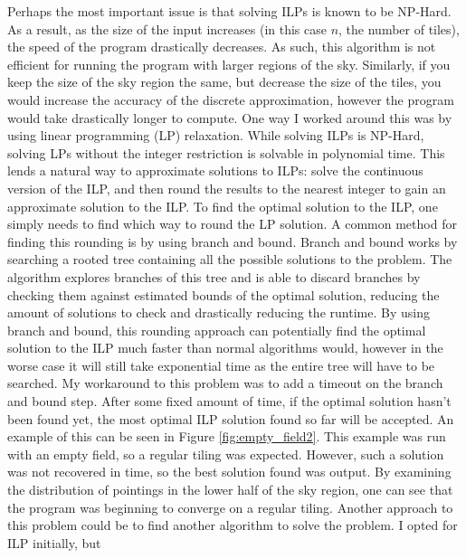 \documentclass{article}
\begin{document}
\begin{multicols*}{2}
Perhaps the most important issue is that solving ILPs is known to be NP-Hard. As a result, as the size of the input increases (in this case $n$, the number of tiles), the speed of the program drastically decreases. As such, this algorithm is not efficient for running the program with larger regions of the sky. Similarly, if you keep the size of the sky region the same, but decrease the size of the tiles, you would increase the accuracy of the discrete approximation, however the program would take drastically longer to compute. One way I worked around this was by using linear programming (LP) relaxation. While solving ILPs is NP-Hard,  solving LPs without the integer restriction is solvable in polynomial time. This lends a natural way to approximate solutions to ILPs: solve the continuous version of the ILP, and then round the results to the nearest integer to gain an approximate solution to the ILP. To find the optimal solution to the ILP, one simply needs to find which way to round the LP solution. A common method for finding this rounding is by using branch and bound. Branch and bound works by searching a rooted tree containing all the possible solutions to the problem. The algorithm explores branches of this tree and is able to discard branches by checking them against estimated bounds of the optimal solution, reducing the amount of solutions to check and drastically reducing the runtime. By using branch and bound, this rounding approach can potentially find the optimal solution to the ILP much faster than normal algorithms would, however in the worse case it will still take exponential time as the entire tree will have to be searched. My workaround to this problem was to add a timeout on the branch and bound step. After some fixed amount of time, if the optimal solution hasn't been found yet, the most optimal ILP solution found so far will be accepted. An example of this can be seen in Figure \ref{fig:empty_field2}. This example was run with an empty field, so a regular tiling was expected. However, such a solution was not recovered in time, so the best solution found was output. By examining the distribution of pointings in the lower half of the sky region, one can see that the program was beginning to converge on a regular tiling. Another approach to this problem could be to find another algorithm to solve the problem. I opted for ILP initially, but 
\begin{figure}[H]
    \centering

\end{figure}
\end{multicols*}
\end{document}
